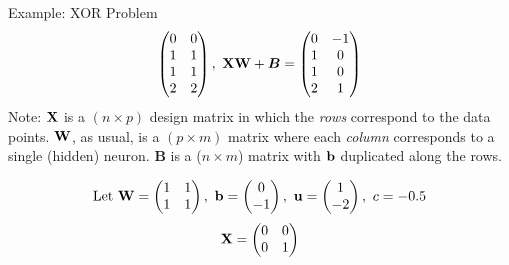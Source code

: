 \documentclass[11pt,compress,t,notes=noshow, xcolor=table]{beamer}
\begin{document}
\begin{vbframe}{Example: XOR Problem}
\begin{eqnarray*}
\begin{pmatrix}
      0 & 0 \\
      1 & 1 \\
      1 & 1 \\
      2 & 2
    \end{pmatrix}, \
      \mathbf{X} \mathbf{W} + \bm{B} = \begin{pmatrix}
        0 & -1 \\
        1 & 0 \\
        1 & 0 \\
        2 & 1
    \end{pmatrix}
  \end{eqnarray*}
 \footnotesize{Note: $\mathbf{X}$ is a $(n \times p)$ design matrix in which the \textit{rows} correspond to the data points. $\mathbf{W}$, as usual, is a $(p \times m)$ matrix where each \textit{column} corresponds to a single (hidden) neuron. $\bm{B}$ is a ($n \times m$) matrix with $\mathbf{b}$ duplicated along the rows.}
 \begin{figure}
    \centering
  \end{figure}
 \framebreak
 \normalsize{
 \begin{eqnarray*}
   \text{Let} \ \mathbf{W} = \begin{pmatrix}
      1 & 1 \\
      1 & 1
    \end{pmatrix}, \
      \mathbf{b} = \begin{pmatrix}
      0 \\
      -1
    \end{pmatrix}, \
      \mathbf{u} = \begin{pmatrix}
      1 \\
      -2
    \end{pmatrix}, \
      c = - 0.5
  \end{eqnarray*}
  \begin{eqnarray*}
  \mathbf{X} = \begin{pmatrix}
      0 & 0 \\
      0 & 1 \\

\end{pmatrix}
\end{eqnarray*}}
\end{vbframe}
\end{document}
